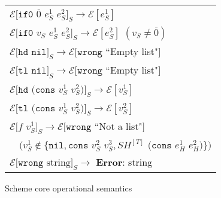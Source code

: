 \begin{figure}[p]
\begin{tabular}{l}
\vspace{5pt}

$\mathscr{E}[\mathtt{if0}$ $\overline{0}$ $e_{S}^{1}$ $e_{S}^{2}]_{S}\rightarrow\mathscr{E}[e_{S}^{1}]$ \\

\vspace{5pt}

$\mathscr{E}[\mathtt{if0}$ $v_{S}$ $e_{S}^{1}$ $e_{S}^{2}]_{S}\rightarrow\mathscr{E}[e_{S}^{2}]$ $(v_{S}\neq\overline{0})$ \\

\vspace{5pt}

$\mathscr{E}[\mathtt{hd}$ $\mathtt{nil}]_{S}\rightarrow\mathscr{E}[\mathtt{wrong}$ ``Empty list"$]$ \\

\vspace{5pt}

$\mathscr{E}[\mathtt{tl}$ $\mathtt{nil}]_{S}\rightarrow\mathscr{E}[\mathtt{wrong}$ ``Empty list"$]$ \\

\vspace{5pt}

$\mathscr{E}[\mathtt{hd}$ $(\mathtt{cons}$ $v_{S}^{1}$ $v_{S}^{2})]_{S}\rightarrow\mathscr{E}[v_{S}^{1}]$ \\

\vspace{5pt}

$\mathscr{E}[\mathtt{tl}$ $(\mathtt{cons}$ $v_{S}^{1}$ $v_{S}^{2})]_{S}\rightarrow\mathscr{E}[v_{S}^{2}]$ \\

\vspace{5pt}

$\mathscr{E}[f$ $v_{S}^{1}]_{S}\rightarrow\mathscr{E}[\mathtt{wrong}$ ``Not a list"$]$ \\

\vspace{5pt}

$\quad(v_{S}^{1}\not\in\lbrace\mathtt{nil},\mathtt{cons}$ $v_{S}^{2}$ $v_{S}^{3},SH^{[T]}$ $(\mathtt{cons}$ $e_{H}^{1}$ $e_{H}^{2})\rbrace)$ \\

\vspace{5pt}

$\mathscr{E}[\mathtt{wrong}$ $\mathrm{string}]_{S}\rightarrow$ \textbf{Error}: string
\end{tabular}
\caption{Scheme core operational semantics}
\label{csos}
\end{figure}